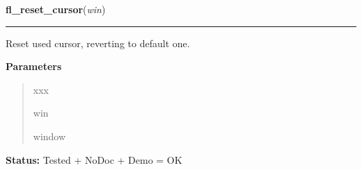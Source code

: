 \hspace{.8\funcindent}\begin{boxedminipage}{\funcwidth}

    \raggedright \textbf{fl\_reset\_cursor}(\textit{win})

    \vspace{-1.5ex}

    \rule{\textwidth}{0.5\fboxrule}
\setlength{\parskip}{2ex}
    Reset used cursor, reverting to default one.

\setlength{\parskip}{1ex}
      \textbf{Parameters}
      \vspace{-1ex}

      \begin{quote}
        \begin{Ventry}{xxx}

          \item[win]

          window

        \end{Ventry}

      \end{quote}

\textbf{Status:} Tested + NoDoc + Demo = OK



    \end{boxedminipage}

    \label{xformslib:library:fl_add_dial}

    \vspace{0.5ex}

